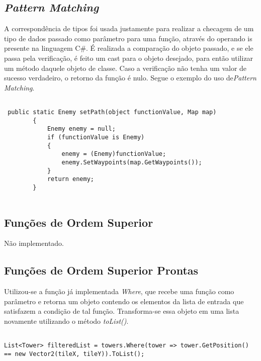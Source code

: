 \documentclass[rel_mlp]{iiufrgs}
\begin{document}
\subsection{\textit{Pattern Matching}}

A correspondência de tipos foi usada justamente para realizar a checagem de um tipo de dados passado como parâmetro para uma função, através do operando is presente na linguagem C\#. É realizada a comparação do objeto passado, e se ele passa pela verificação, é feito um cast para o objeto desejado, para então utilizar um método daquele objeto de classe. Caso a verificação não tenha um valor de sucesso verdadeiro, o retorno da função é nulo. Segue o exemplo do uso de\textit{Pattern Matching}.

\begin{lstlisting}[caption=Trecho de código C\# retirado da implementação deste trabalho, label=lst:test]

 public static Enemy setPath(object functionValue, Map map)
        {
            Enemy enemy = null;
            if (functionValue is Enemy)
            {
                enemy = (Enemy)functionValue;
                enemy.SetWaypoints(map.GetWaypoints());               
            }
            return enemy;
        }


\end{lstlisting}

\subsection{Funções de Ordem Superior}

Não implementado.

\subsection{Funções de Ordem Superior Prontas}

Utilizou-se a função já implementada \textit{Where}, que recebe uma função como parâmetro e retorna um objeto contendo os elementos da lista de entrada que satisfazem a condição de tal função. Transforma-se essa objeto em uma lista novamente utilizando o método \textit{toList()}.

\begin{lstlisting}[caption=Trecho de código C\# retirado da implementação deste trabalho, label=lst:test]

List<Tower> filteredList = towers.Where(tower => tower.GetPosition() == new Vector2(tileX, tileY)).ToList();
			
\end{lstlisting}
\end{document}
